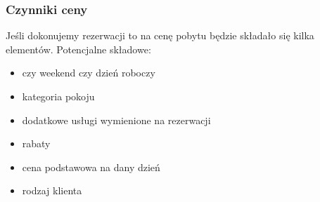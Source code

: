\documentclass[12pt, a4paper]{article}
\begin{document}
\subsubsection{Czynniki ceny}
Jeśli dokonujemy rezerwacji to na cenę pobytu będzie składało się kilka
elementów. Potencjalne składowe:
\begin{itemize}
  \item czy weekend czy dzień roboczy
  \item kategoria pokoju
  \item dodatkowe usługi wymienione na rezerwacji
  \item rabaty
  \item cena podstawowa na dany dzień
  \item rodzaj klienta
\end{itemize}
\end{document}
